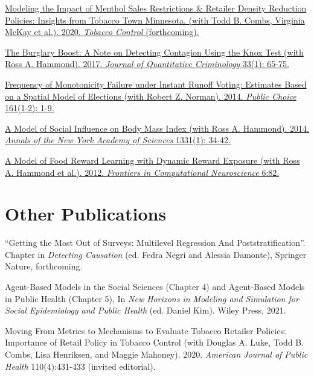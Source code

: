 \documentclass[margin,line]{res}
\newenvironment{publist}{
	\begin{list}{}{%
			\setlength{\itemsep}{0.15in}
			\setlength{\parsep}{0in} \setlength{\parskip}{0in}
			\setlength{\topsep}{0in} \setlength{\partopsep}{0in} 
			\setlength{\leftmargin}{0.15in}
			\setlength{\itemindent}{-0.15in}}}
		{\end{list}}
\begin{document}
\begin{resume}
\begin{publist}
	\item \href{http://dx.doi.org/10.1136/tobaccocontrol-2019-054986}{Modeling the Impact of Menthol Sales Restrictions \& Retailer Density Reduction Policies: Insights from Tobacco Town Minnesota. (with Todd B. Combs, Virginia McKay et al.). 2020. \textit{Tobacco Control} (forthcoming).}
	
	\item \href{https://joeornstein.github.io/publications/Ornstein-Hammond2017.pdf}{The Burglary Boost: A Note on Detecting Contagion Using the Knox Test (with Ross A. Hammond). 2017. \textit{Journal of Quantitative Criminology} 33(1): 65-75.}
	
	\item \href{https://joeornstein.github.io/publications/Ornstein-Norman-2014/Ornstein-Norman-2014.pdf}{Frequency of Monotonicity Failure under Instant Runoff Voting: Estimates Based on a Spatial Model of Elections (with Robert Z. Norman). 2014. \textit{Public Choice} 161(1-2): 1-9.}
	
	\item \href{https://joeornstein.github.io/publications/Hammond_et_al-2014-Annals_of_the_New_York_Academy_of_Sciences.pdf}{A Model of Social Influence on Body Mass Index (with Ross A. Hammond). 2014. \textit{Annals of the New York Academy of Sciences} 1331(1): 34-42.}
	
	\item \href{https://joeornstein.github.io/publications/Hammond-2012.pdf}{A Model of Food Reward Learning with Dynamic Reward Exposure (with Ross A. Hammond et al.). 2012. \textit{Frontiers in Computational Neuroscience} 6:82.}	
\end{publist}




\section{\sc Other Publications}

\begin{publist}
	\item ``Getting the Most Out of Surveys: Multilevel Regression And Poststratification''. Chapter in \textit{Detecting Causation} (ed. Fedra Negri and Alessia Damonte), Springer Nature, forthcoming.
	\item Agent-Based Models in the Social Sciences (Chapter 4) and Agent-Based Models in Public Health (Chapter 5), In \textit{New Horizons in Modeling and Simulation for Social Epidemiology and Public Health} (ed. Daniel Kim). Wiley Press, 2021. 
	\item Moving From Metrics to Mechanisms to Evaluate Tobacco Retailer Policies: Importance of Retail Policy in Tobacco Control (with Douglas A. Luke, Todd B. Combs, Lisa Henriksen, and Maggie Mahoney). 2020. \textit{American Journal of Public Health} 110(4):431-433 (invited editorial).
\end{publist}




\end{resume}
\end{document}
